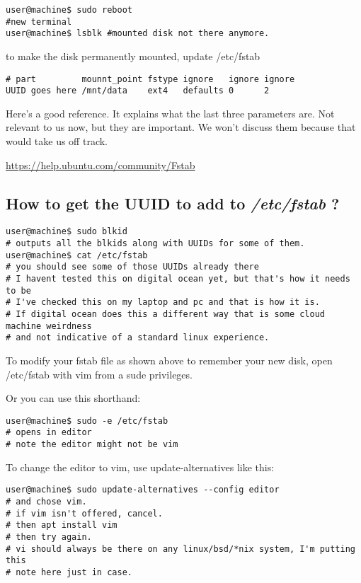 \documentclass[10pt]{article}
\begin{document}
\begin{lstlisting}
user@machine$ sudo reboot
#new terminal
user@machine$ lsblk #mounted disk not there anymore.
\end{lstlisting}

to make the disk permanently mounted, update /etc/fstab

\begin{verbatim}
# part         mounnt_point fstype ignore   ignore ignore
UUID goes here /mnt/data    ext4   defaults 0      2
\end{verbatim}

Here's a good reference. It explains what the last three parameters are. Not relevant to us now, but they are important. We won't discuss them because that would take us off track.

\url{https://help.ubuntu.com/community/Fstab}

\subsection{How to get the UUID to add to \textit{/etc/fstab} ?}

\begin{lstlisting}
user@machine$ sudo blkid
# outputs all the blkids along with UUIDs for some of them.
user@machine$ cat /etc/fstab
# you should see some of those UUIDs already there
# I havent tested this on digital ocean yet, but that's how it needs to be
# I've checked this on my laptop and pc and that is how it is.
# If digital ocean does this a different way that is some cloud machine weirdness
# and not indicative of a standard linux experience.
\end{lstlisting}

To modify your fstab file as shown above to remember your new disk, open /etc/fstab with vim from a sude privileges. 

Or you can use this shorthand:

\begin{lstlisting}
user@machine$ sudo -e /etc/fstab
# opens in editor
# note the editor might not be vim
\end{lstlisting}

To change the editor to vim, use update-alternatives like this:

\begin{lstlisting}
user@machine$ sudo update-alternatives --config editor
# and chose vim.
# if vim isn't offered, cancel.
# then apt install vim
# then try again.
# vi should always be there on any linux/bsd/*nix system, I'm putting this 
# note here just in case.
\end{lstlisting}
\end{document}
